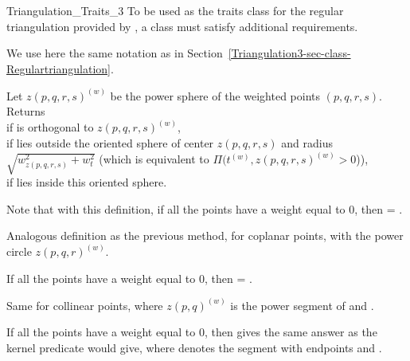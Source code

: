 \begin{ccClass}{Triangulation_Traits_3}
To be used as the traits class for the regular triangulation provided
by \cgal, a class must satisfy additional requirements.

We use here the same notation as in
Section~\ref{Triangulation3-sec-class-Regulartriangulation}. 

{Let ${z(p,q,r,s)}^{(w)}$ be the power sphere of the weighted points 
$(p,q,r,s)$. Returns \\
 if  is orthogonal to
${z(p,q,r,s)}^{(w)}$,\\ 
 if  lies outside the oriented sphere of
center $z(p,q,r,s)$ and radius $\sqrt{ w_{z(p,q,r,s)}^2 + w_t^2 }$
(which is equivalent to $\Pi({t}^{(w)},{z(p,q,r,s)}^{(w)} >0$)),\\
 if  lies inside this oriented sphere.
}

Note that with this definition, if all the points have a weight equal
to 0, then
 = .

{Analogous definition as the previous method, for coplanar points,
with the power circle ${z(p,q,r)}^{(w)}$.
}

If all the points have a weight equal to 0, then
 = .

{Same for collinear points, where ${z(p,q)}^{(w)}$ is the
power segment of  and .
}

If all the points have a weight equal to 0, then
 gives the same answer as the kernel predicate
 would give, where   denotes the
segment with endpoints  and .

	\end{ccClass} 

